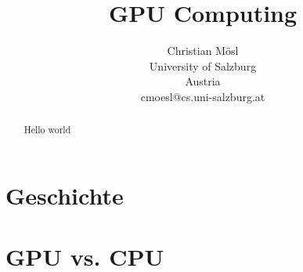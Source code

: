 \documentclass[a4paper]{article}
\title{GPU Computing}
\author{Christian M\"osl \\ \small{University of Salzburg} \\ \small{Austria} \\ \small{cmoesl@cs.uni-salzburg.at}}
\date{\vspace{-5ex}}
\begin{document}
\maketitle

\begin{abstract}
Hello world
\end{abstract}


\section{Geschichte}

\section{GPU vs. CPU}

\section{}


\cite{MoreVMs18} 



\end{document}
